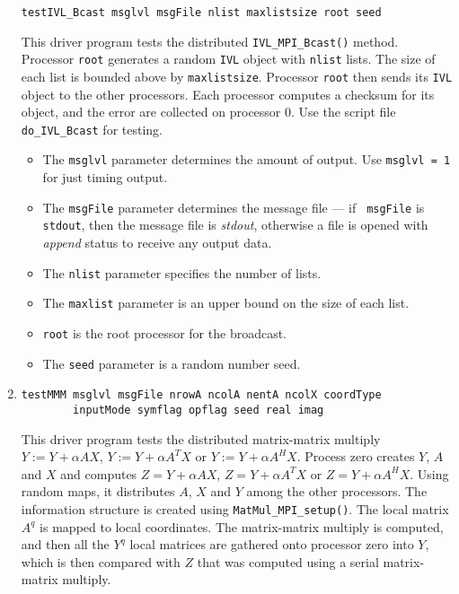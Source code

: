 \begin{enumerate}
\begin{verbatim}
testIVL_Bcast msglvl msgFile nlist maxlistsize root seed 
\end{verbatim}
This driver program tests the distributed 
{\tt IVL\_MPI\_Bcast()} method.
Processor {\tt root} generates a random {\tt IVL} object
with {\tt nlist} lists.
The size of each list is bounded above by {\tt maxlistsize}.
Processor {\tt root} then sends its {\tt IVL} object to the other
processors.
Each processor computes a checksum for its object, and the error
are collected on processor 0.
Use the script file {\tt do\_IVL\_Bcast} for testing.
\par
\begin{itemize}
\item
The {\tt msglvl} parameter determines the amount of output.
Use {\tt msglvl = 1} for just timing output.
\item
The {\tt msgFile} parameter determines the message file --- if {\tt
msgFile} is {\tt stdout}, then the message file is {\it stdout},
otherwise a file is opened with {\it append} status to receive any
output data.
\item
The {\tt nlist} parameter specifies the number of lists.
\item
The {\tt maxlist} parameter is an upper bound on the size of each list.
\item
{\tt root} is the root processor for the broadcast.
\item
The {\tt seed} parameter is a random number seed.
\end{itemize}
\item
\begin{verbatim}
testMMM msglvl msgFile nrowA ncolA nentA ncolX coordType
        inputMode symflag opflag seed real imag
\end{verbatim}
This driver program tests the distributed matrix-matrix multiply
$Y := Y + \alpha A X$,
$Y := Y + \alpha A^T X$ or
$Y := Y + \alpha A^H X$.
Process zero creates $Y$, $A$ and $X$ and computes
$Z = Y + \alpha A X$,
$Z = Y + \alpha A^T X$ or
$Z = Y + \alpha A^H X$.
Using random maps, it distributes $A$, $X$ and $Y$ among the other
processors.
The information structure is created using
{\tt MatMul\_MPI\_setup()}.
The local matrix $A^q$ is mapped to local coordinates.
The matrix-matrix multiply is computed,
and then all the $Y^q$ local matrices are gathered onto processor
zero into $Y$, which is then compared with $Z$ that was computed
using a serial matrix-matrix multiply.

\end{enumerate}
